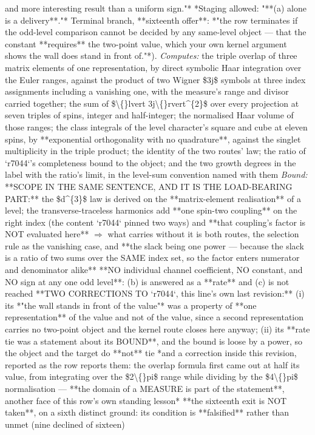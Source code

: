 \begin{description}
and more interesting result than a uniform sign."*  *Staging allowed: "**(a) alone is a delivery**."*  Terminal branch, **sixteenth offer**: *"the row terminates if the odd-level comparison cannot be decided by any same-level object --- that the constant **requires** the two-point value, which your own kernel argument shows the wall does stand in front of."*). 
\emph{Computes:} the triple overlap of three matrix elements of one representation, by direct symbolic Haar integration over the Euler ranges, against the product of two Wigner \$3j\$ symbols at three index assignments including a vanishing one, with the measure's range and divisor carried together; the sum of \$\textbackslash\{\}lvert 3j\textbackslash\{\}rvert\textasciicircum{}\{2\}\$ over every projection at seven triples of spins, integer and half-integer; the normalised Haar volume of those ranges; the class integrals of the level character's square and cube at eleven spins, by **exponential orthogonality with no quadrature**, against the singlet multiplicity in the triple product; the identity of the two routes' law; the ratio of `r7044`'s completeness bound to the object; and the two growth degrees in the label with the ratio's limit, in the level-sum convention named with them
 \emph{Bound:}  **SCOPE IN THE SAME SENTENCE, AND IT IS THE LOAD-BEARING PART:** the \$d\textasciicircum{}\{3\}\$ law is derived on the **matrix-element realisation** of a level; the transverse-traceless harmonics add **one spin-two coupling** on the right index (the content `r7044` pinned two ways) and **that coupling's factor is NOT evaluated here** \ensuremath{\Rightarrow} what carries without it is both routes, the selection rule as the vanishing case, and **the slack being one power --- because the slack is a ratio of two sums over the SAME index set, so the factor enters numerator and denominator alike**  **NO individual channel coefficient, NO constant, and NO sign at any one odd level**: (b) is answered as a **rate** and (c) is not reached  **TWO CORRECTIONS TO `r7044`, this line's own last revision:** (i) its *"the wall stands in front of the value"* was a property of **one representation** of the value and not of the value, since a second representation carries no two-point object and the kernel route closes here anyway; (ii) its **rate tie was a statement about its BOUND**, and the bound is loose by a power, so the object and the target do **not** tie  *and a correction inside this revision, reported as the row reports them: the overlap formula first came out at half its value, from integrating over the \$2\textbackslash\{\}pi\$ range while dividing by the \$4\textbackslash\{\}pi\$ normalisation --- **the domain of a MEASURE is part of the statement**, another face of this row's own standing lesson*  **the sixteenth exit is NOT taken**, on a sixth distinct ground: its condition is **falsified** rather than unmet (nine declined of sixteen)

\end{description}

